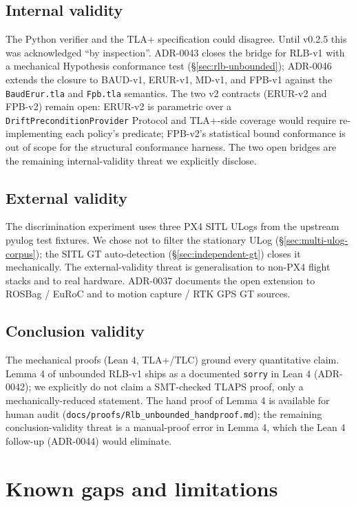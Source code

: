 \documentclass[acmsmall,nonacm=true,review=false]{acmart}
\theoremstyle{plain}
\begin{document}
\subsection{Internal validity}

The Python verifier and the TLA+ specification could disagree.
Until v0.2.5 this was acknowledged ``by inspection''. ADR-0043
closes the bridge for RLB-v1 with a mechanical Hypothesis
conformance test (\S\ref{sec:rlb-unbounded}); ADR-0046 extends
the closure to BAUD-v1, ERUR-v1, MD-v1, and FPB-v1 against the
\texttt{BaudErur.tla} and \texttt{Fpb.tla} semantics. The two
v2 contracts (ERUR-v2 and FPB-v2) remain open: ERUR-v2 is
parametric over a \texttt{DriftPreconditionProvider} Protocol
and TLA+-side coverage would require re-implementing each
policy's predicate; FPB-v2's statistical bound conformance is
out of scope for the structural conformance harness. The two
open bridges are the remaining internal-validity threat we
explicitly disclose.

\subsection{External validity}

The discrimination experiment uses three PX4 SITL ULogs from
the upstream pyulog test fixtures. We chose not to filter the
stationary ULog (\S\ref{sec:multi-ulog-corpus}); the SITL GT
auto-detection (\S\ref{sec:independent-gt}) closes it
mechanically. The external-validity threat is generalisation to
non-PX4 flight stacks and to real hardware. ADR-0037
documents the open extension to ROSBag / EuRoC and to motion
capture / RTK GPS GT sources.

\subsection{Conclusion validity}

The mechanical proofs (Lean 4, TLA+/TLC) ground every
quantitative claim. Lemma 4 of unbounded RLB-v1 ships as a
documented \texttt{sorry} in Lean 4 (ADR-0042); we explicitly
do not claim a SMT-checked TLAPS proof, only a
mechanically-reduced statement. The hand proof of Lemma 4 is
available for human audit
(\texttt{docs/proofs/Rlb\_unbounded\_handproof.md}); the
remaining conclusion-validity threat is a manual-proof error
in Lemma 4, which the Lean 4 follow-up (ADR-0044) would
eliminate.

\section{Known gaps and limitations}
\end{document}
